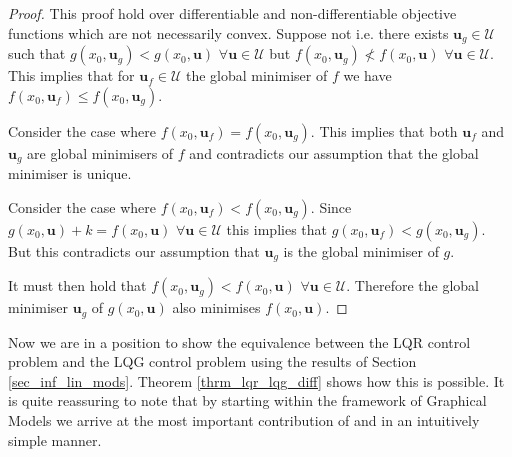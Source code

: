 \begin{proof}
This proof hold over differentiable and non-differentiable objective functions which are not necessarily convex. Suppose not i.e. there exists  $\mathbf{u}_g \in \mathcal{U}$ such that $g(x_0, \mathbf{u}_g) < g(x_0, \mathbf{u})$ $\forall \mathbf{u} \in \mathcal{U}$ but $f(x_0, \mathbf{u}_g) \nless f(x_0, \mathbf{u})$ $\forall \mathbf{u} \in \mathcal{U}$. This implies that for $\mathbf{u}_f \in \mathcal{U}$ the global minimiser of $f$  we have $f(x_0, \mathbf{u}_f) \leq f(x_0, \mathbf{u}_g)$. 

Consider the case where $f(x_0, \mathbf{u}_f) = f(x_0, \mathbf{u}_g)$. This implies that both $\mathbf{u}_f$ and $\mathbf{u}_g$ are global minimisers of $f$ and contradicts our assumption that the global minimiser is unique.

Consider the case where $f(x_0, \mathbf{u}_f) < f(x_0, \mathbf{u}_g)$. Since $g(x_0, \mathbf{u}) + k = f(x_0, \mathbf{u})$ $\forall \mathbf{u} \in \mathcal{U}$ this implies that $g(x_0, \mathbf{u}_f) < g(x_0, \mathbf{u}_g)$. But this contradicts our assumption that $\mathbf{u}_g$ is the global minimiser of $g$.

It must then hold that $f(x_0, \mathbf{u}_g) < f(x_0, \mathbf{u})$ $\forall \mathbf{u} \in \mathcal{U}$. Therefore the global minimiser $\mathbf{u}_g$ of $g(x_0, \mathbf{u})$ also minimises $f(x_0, \mathbf{u})$. 
\end{proof}
Now we are in a position to show the equivalence between the LQR control problem and the LQG control problem using the results of Section \ref{sec_inf_lin_mods}. Theorem \ref{thrm_lqr_lqg_diff} shows how this is possible. It is quite reassuring to note that by starting within the framework of Graphical Models we arrive at the most important contribution of \cite{yan1} and \cite{yan2} in an intuitively simple manner.
